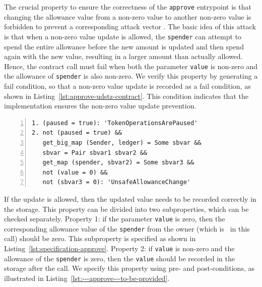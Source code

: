 \documentclass[a4paper,USenglish,cleveref, autoref, thm-restate]{lipics-v2021}
\begin{document}
The crucial property to ensure the correctness of the \texttt{approve}
entrypoint is that changing the allowance value from a non-zero value
to another non-zero value is forbidden to prevent a corresponding
attack vector \cite{attack-vector}. The basic idea of this attack is
that when a non-zero value update is allowed, the \lstinline/spender/
can attempt to spend the entire allowance before the new amount is
updated and then spend again with the new value, resulting in a larger
amount than actually allowed. Hence, the contract call must fail when
both the parameter \lstinline/value/ is non-zero and the allowance of
\lstinline/spender/ is also non-zero. We verify this property by
generating a fail condition, so that a non-zero value update is
recorded as a fail condition, as shown in
Listing~\ref{lst:approve-udstz-contract}. This condition indicates
that the implementation ensures the non-zero value update prevention. 
\begin{lstlisting}[float=tp,captionpos=b,caption={Fail conditions for the \lstinline/approve/ entrypoint},label={lst:approve-udstz-contract},numbers=left]
1. (paused = true): 'TokenOperationsArePaused'
2. not (paused = true) &&
   get_big_map (Sender, ledger) = Some sbvar &&
   sbvar = Pair sbvar1 sbvar2 &&
   get_map (spender, sbvar2) = Some sbvar3 &&
   not (value = 0) &&
   not (sbvar3 = 0): 'UnsafeAllowanceChange'
\end{lstlisting}
If the update is allowed, then the updated value needs to be recorded
correctly in the storage. This property can be divided into two
subproperties, which can be checked separately. Property 1: if the
parameter \lstinline/value/ is zero, then the 
corresponding allowance value of the \lstinline/spender/ from the
owner (which is \SENDER\ in this call) should be zero. This
subproperty is specified as shown in
Listing~\ref{lst:specification-approve}. Property 2: if
\lstinline/value/ is non-zero and the allowance of the \lstinline/spender/ is zero, then the \lstinline/value/ should be recorded in the storage after the call. We specify this property using pre- and post-conditions, as illustrated in Listing~\ref{lst:---approve---to-be-provided}.
\end{document}
